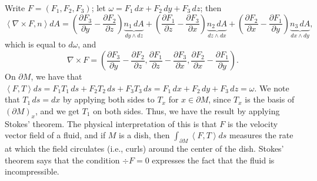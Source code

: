 \noindent Write $F = (F_1, F_2, F_3)$; let $\omega = F_1 \, dx + F_2 \, dy + F_3 \, dz$; then
\[ \left<\nabla \times F, n\right> dA = \left(\frac{\partial F_3}{\partial y} - \frac{\partial F_2}{\partial z}\right) \underbrace{n_1 \, dA}_{dy \wedge dz} + \left(\frac{\partial F_1}{\partial z} - \frac{\partial F_3}{\partial x}\right) \underbrace{n_2 \, dA}_{dz \wedge dx} + \left(\frac{\partial F_2}{\partial x} - \frac{\partial F_1}{\partial y}\right) \underbrace{n_3 \, dA}_{dx \wedge dy}, \]
which is equal to $d\omega$, and
\[ \nabla \times F = \left(\frac{\partial F_3}{\partial y} - \frac{\partial F_2}{\partial z}, \frac{\partial F_1}{\partial z} - \frac{\partial F_3}{\partial x}, \frac{\partial F_2}{\partial x} - \frac{\partial F_1}{\partial y}\right). \]
On $\partial M$, we have that $\left<F, T\right> ds = F_1T_1 \, ds + F_2T_2 \, ds + F_3T_3 \, ds = F_1 \, dx + F_2 \, dy + F_3 \, dz = \omega$. We note that $T_1 \, ds = dx$ by applying both sides to $T_x$ for $x \in \partial M$, since $T_x$ is the basis of $(\partial M)_x$, and we get $T_1$ on both sides. Thus, we have the result by applying Stokes' theorem. The physical interpretation of this is that $F$ is the velocity vector field of a fluid, and if $M$ is a dish, then $\int_{\partial M} \left<F, T\right> ds$ measures the rate at which the field circulates (i.e., curls) around the center of the dish. Stokes' theorem says that the condition $\div F = 0$ expresses the fact that the fluid is incompressible.